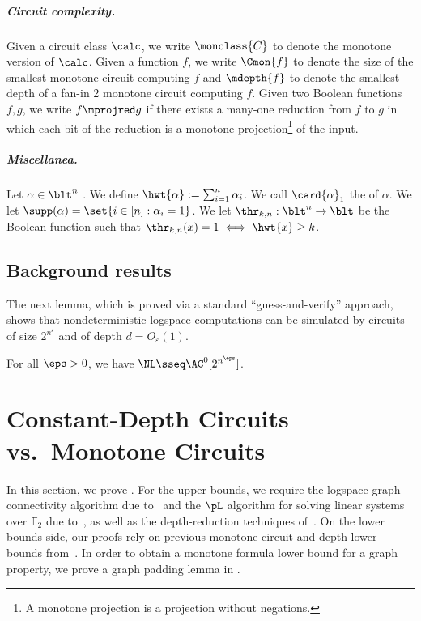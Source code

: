 \documentclass[11pt]{article}
\begin{document}
\subparagraph{Circuit complexity.}

Given a circuit class $\calc$, we write
    $\monclass{C}$ to denote the
    monotone version of $\calc$.
Given a function $f$, we write $\Cmon{f}$
    to denote the size of the smallest monotone circuit computing
    $f$ and $\mdepth{f}$ to denote the smallest depth of a fan-in 2
    monotone circuit computing $f$.
Given two Boolean functions $f,g$, we write
$f \mprojred g$ if
there exists a many-one reduction from $f$ to $g$
in which each bit of the reduction is a monotone
projection\footnote{A monotone projection is a projection without
negations.}
of the input.

\subparagraph{Miscellanea.}

Let $\alpha \in \blt^n$ .
    We 
    define
    $\hwt{\alpha} := \sum_{i=1}^n \alpha_i$.
    We call $\card{\alpha}_1$ the  of $\alpha$.
    We let
    $\supp(\alpha) = \set{i \in [n] : \alpha_i = 1}$.
We let $\thr_{k,n} : \blt^n \to \blt$ be the Boolean function
    such that
    $\thr_{k,n}(x) = 1 \iff \hwt{x} \geq k$.



\subsection{Background results}


The next lemma, which is proved via a standard ``guess-and-verify''
approach, shows that nondeterministic logspace computations can be
simulated by circuits of size $2^{n^{\varepsilon}}$ and of depth $d =
O_\varepsilon(1)$.

\begin{lemma}
    \label{lemma:ac0_nc1_sim}
    For all $\eps > 0$, we have
    $\NL \sseq \AC^0[2^{n^\eps}]$.
\end{lemma}






\section{Constant-Depth Circuits vs.~Monotone Circuits}
\label{s:constant-depth}

In this section, we prove .
For the upper bounds, we require
the logspace graph connectivity algorithm due
to~\cite{DBLP:conf/stoc/Reingold05}
and the $\pL$ algorithm for solving linear systems over $\mathbb{F}_2$ due
to~\cite{DBLP:journals/mst/BuntrockDHM92},
as well as the
depth-reduction techniques of~\cite{AKRRV01,AHMPS08}.
On the lower bounds side,
our proofs rely on previous monotone circuit and depth lower bounds
from~\cite{DBLP:journals/combinatorica/BabaiGW99,gkrs19}.
In order to obtain a monotone formula lower bound for a graph property,
we prove a graph padding lemma in .
\end{document}
